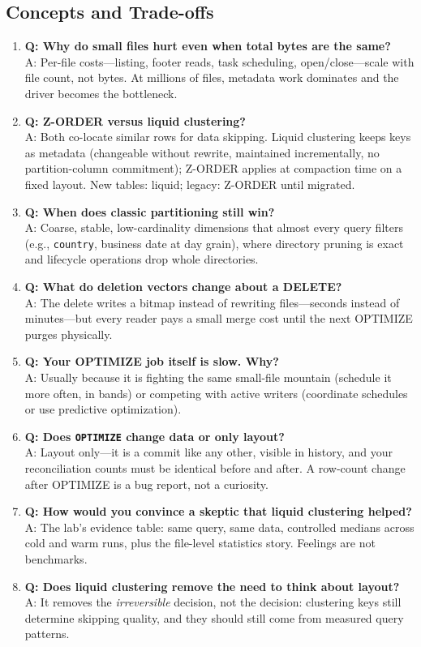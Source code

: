 \subsection{Concepts and Trade-offs}
\begin{enumerate}
    \item \textbf{Q: Why do small files hurt even when total bytes are the same?}\\
    A: Per-file costs---listing, footer reads, task scheduling, open/close---scale with file count, not bytes. At millions of files, metadata work dominates and the driver becomes the bottleneck.
    \item \textbf{Q: Z-ORDER versus liquid clustering?}\\
    A: Both co-locate similar rows for data skipping. Liquid clustering keeps keys as metadata (changeable without rewrite, maintained incrementally, no partition-column commitment); Z-ORDER applies at compaction time on a fixed layout. New tables: liquid; legacy: Z-ORDER until migrated.
    \item \textbf{Q: When does classic partitioning still win?}\\
    A: Coarse, stable, low-cardinality dimensions that almost every query filters (e.g., \texttt{country}, business date at day grain), where directory pruning is exact and lifecycle operations drop whole directories.
    \item \textbf{Q: What do deletion vectors change about a DELETE?}\\
    A: The delete writes a bitmap instead of rewriting files---seconds instead of minutes---but every reader pays a small merge cost until the next OPTIMIZE purges physically.
    \item \textbf{Q: Your OPTIMIZE job itself is slow. Why?}\\
    A: Usually because it is fighting the same small-file mountain (schedule it more often, in bands) or competing with active writers (coordinate schedules or use predictive optimization).
    \item \textbf{Q: Does \texttt{OPTIMIZE} change data or only layout?}\\
    A: Layout only---it is a commit like any other, visible in history, and your reconciliation counts must be identical before and after. A row-count change after OPTIMIZE is a bug report, not a curiosity.
    \item \textbf{Q: How would you convince a skeptic that liquid clustering helped?}\\
    A: The lab's evidence table: same query, same data, controlled medians across cold and warm runs, plus the file-level statistics story. Feelings are not benchmarks.
    \item \textbf{Q: Does liquid clustering remove the need to think about layout?}\\
    A: It removes the \emph{irreversible} decision, not the decision: clustering keys still determine skipping quality, and they should still come from measured query patterns.
\end{enumerate}


